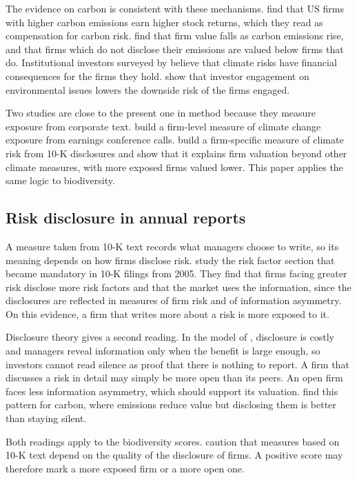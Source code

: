 \documentclass[12pt,a4paper]{article}
\begin{document}
The evidence on carbon is consistent with these mechanisms. \citet{bolton2021} find that US firms with higher carbon emissions earn higher stock returns, which they read as compensation for carbon risk. \citet{matsumura2014} find that firm value falls as carbon emissions rise, and that firms which do not disclose their emissions are valued below firms that do. Institutional investors surveyed by \citet{krueger2020} believe that climate risks have financial consequences for the firms they hold. \citet{hoepner2024} show that investor engagement on environmental issues lowers the downside risk of the firms engaged.

Two studies are close to the present one in method because they measure exposure from corporate text. \citet{sautner2023} build a firm-level measure of climate change exposure from earnings conference calls. \citet{berkman2024} build a firm-specific measure of climate risk from 10-K disclosures and show that it explains firm valuation beyond other climate measures, with more exposed firms valued lower. This paper applies the same logic to biodiversity.

\subsection{Risk disclosure in annual reports}

A measure taken from 10-K text records what managers choose to write, so its meaning depends on how firms disclose risk. \citet{campbell2014} study the risk factor section that became mandatory in 10-K filings from 2005. They find that firms facing greater risk disclose more risk factors and that the market uses the information, since the disclosures are reflected in measures of firm risk and of information asymmetry. On this evidence, a firm that writes more about a risk is more exposed to it.

Disclosure theory gives a second reading. In the model of \citet{verrecchia1983}, disclosure is costly and managers reveal information only when the benefit is large enough, so investors cannot read silence as proof that there is nothing to report. A firm that discusses a risk in detail may simply be more open than its peers. An open firm faces less information asymmetry, which should support its valuation. \citet{matsumura2014} find this pattern for carbon, where emissions reduce value but disclosing them is better than staying silent.

Both readings apply to the biodiversity scores. \citet{giglio2026} caution that measures based on 10-K text depend on the quality of the disclosure of firms. A positive score may therefore mark a more exposed firm or a more open one.
\end{document}

